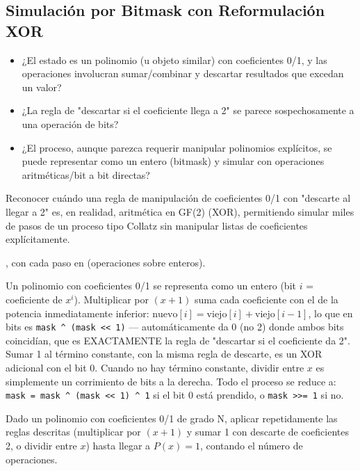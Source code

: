 \subsection{Simulación por Bitmask con Reformulación XOR}


\begin{itemize}
\item ¿El estado es un polinomio (u objeto similar) con coeficientes 0/1, y las operaciones involucran sumar/combinar y descartar resultados que excedan un valor?
\item ¿La regla de "descartar si el coeficiente llega a 2" se parece sospechosamente a una operación de bits?
\item ¿El proceso, aunque parezca requerir manipular polinomios explícitos, se puede representar como un entero (bitmask) y simular con operaciones aritméticas/bit a bit directas?
\end{itemize}

 Reconocer cuándo una regla de manipulación de coeficientes 0/1 con "descarte al llegar a 2" es, en realidad, aritmética en GF(2) (XOR), permitiendo simular miles de pasos de un proceso tipo Collatz sin manipular listas de coeficientes explícitamente.

 , con cada paso en  (operaciones sobre enteros).

 Un polinomio con coeficientes 0/1 se representa como un entero (bit $i$ = coeficiente de $x^i$). Multiplicar por $(x+1)$ suma cada coeficiente con el de la potencia inmediatamente inferior: $\text{nuevo}[i] = \text{viejo}[i] + \text{viejo}[i-1]$, lo que en bits es \texttt{mask \^{} (mask << 1)} — automáticamente da 0 (no 2) donde ambos bits coincidían, que es EXACTAMENTE la regla de "descartar si el coeficiente da 2". Sumar 1 al término constante, con la misma regla de descarte, es un XOR adicional con el bit 0. Cuando no hay término constante, dividir entre $x$ es simplemente un corrimiento de bits a la derecha. Todo el proceso se reduce a: \texttt{mask = mask \^{} (mask << 1) \^{} 1} si el bit 0 está prendido, o \texttt{mask >>= 1} si no.


Dado un polinomio con coeficientes 0/1 de grado N, aplicar repetidamente las reglas descritas (multiplicar por $(x+1)$ y sumar 1 con descarte de coeficientes 2, o dividir entre $x$) hasta llegar a $P(x)=1$, contando el número de operaciones.

